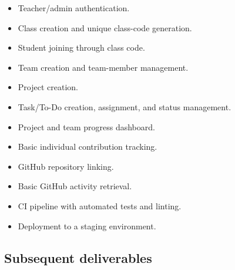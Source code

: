 \documentclass[11pt,a4paper]{article}
\begin{document}
\begin{itemize}[leftmargin=0.7cm]

    \item Teacher/admin authentication.

    \item Class creation and unique class-code generation.

    \item Student joining through class code.

    \item Team creation and team-member management.

    \item Project creation.

    \item Task/To-Do creation, assignment, and status management.

    \item Project and team progress dashboard.

    \item Basic individual contribution tracking.

    \item GitHub repository linking.

    \item Basic GitHub activity retrieval.

    \item CI pipeline with automated tests and linting.

    \item Deployment to a staging environment.

\end{itemize}


\subsection{Subsequent deliverables}
\end{document}
